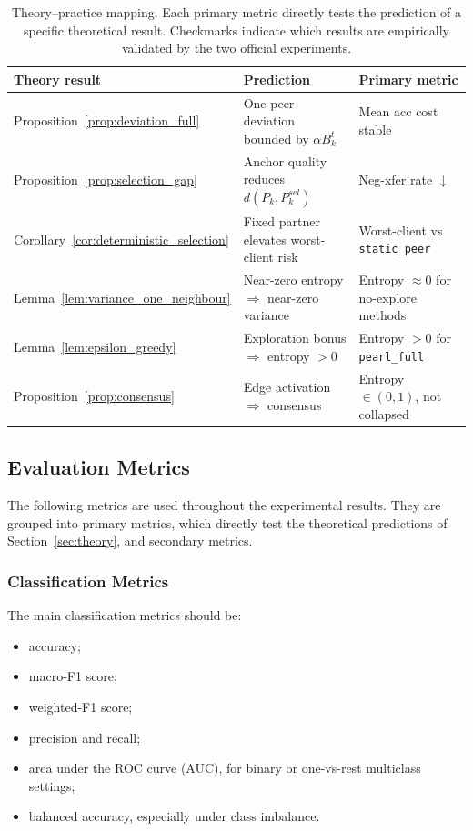 \documentclass[conference]{IEEEtran}
\begin{document}
\begin{table}[t]
\centering
\caption{Theory--practice mapping. Each primary metric directly tests the prediction of a specific theoretical result. Checkmarks indicate which results are empirically validated by the two official experiments.}
\label{tab:theory_practice}
\renewcommand{\arraystretch}{1.15}
\setlength{\tabcolsep}{4pt}
\begin{tabular}{lll}
\toprule
\textbf{Theory result} & \textbf{Prediction} & \textbf{Primary metric} \\
\midrule
Proposition~\ref{prop:deviation_full}   & One-peer deviation bounded by $\alpha B_k^t$ & Mean acc cost stable \\
Proposition~\ref{prop:selection_gap} & Anchor quality reduces $d(P_k,P^{sel}_k)$ & Neg-xfer rate $\downarrow$ \\
Corollary~\ref{cor:deterministic_selection} & Fixed partner elevates worst-client risk & Worst-client vs \texttt{static\_peer} \\
Lemma~\ref{lem:variance_one_neighbour}           & Near-zero entropy $\Rightarrow$ near-zero variance & Entropy $\approx0$ for no-explore methods \\
Lemma~\ref{lem:epsilon_greedy}     & Exploration bonus $\Rightarrow$ entropy $>0$ & Entropy $>0$ for \texttt{pearl\_full} \\
Proposition~\ref{prop:consensus}   & Edge activation $\Rightarrow$ consensus & Entropy $\in(0,1)$, not collapsed \\
\bottomrule
\end{tabular}
\end{table}

\subsection{Evaluation Metrics}
\label{subsec:evaluation-metrics}

The following metrics are used throughout the experimental results. They are grouped into primary metrics, which directly test the theoretical predictions of Section~\ref{sec:theory}, and secondary metrics.

\subsubsection{Classification Metrics}
\label{subsubsec:classification-metrics}
The main classification metrics should be:
\begin{itemize}
    \item accuracy;
    \item macro-F1 score;
    \item weighted-F1 score;
    \item precision and recall;
    \item area under the ROC curve (AUC), for binary or one-vs-rest multiclass settings;
    \item balanced accuracy, especially under class imbalance.
\end{itemize}
\end{document}
